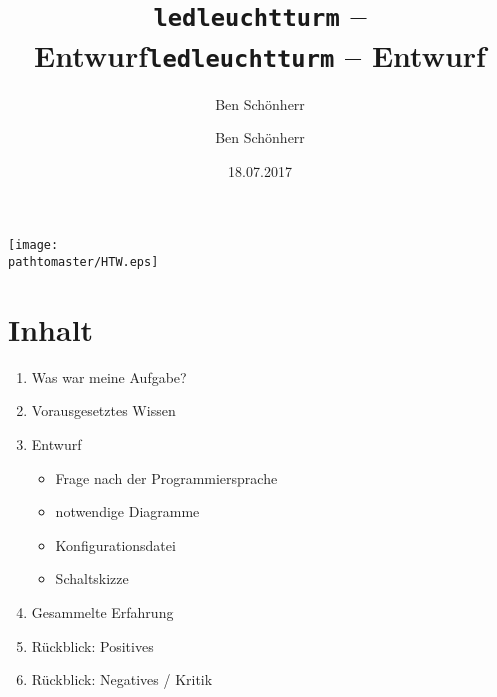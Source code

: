 \documentclass[ignorenonframetext, 11pt, table]{beamer}
\author{Ben Schönherr}
\title{\texttt{ledleuchtturm} -- Entwurf}
\date{18.07.2017}
\gdef\pathtomaster{../_LaTeX_master}
\begin{document}
\author{Ben Schönherr}
\title{\texttt{ledleuchtturm} -- Entwurf}

\begin{frame}[plain]
\begin{center}
\texttt{[image: \\pathtomaster/HTW.eps]}
\end{center}
\maketitle
\end{frame}
\section{Inhalt}
\begin{frame}
	\begin{enumerate}
		\setlength\itemsep{0.2em}
		\item Was war meine Aufgabe?
		\item Vorausgesetztes Wissen	
		\item Entwurf
		\begin{itemize}
			\setlength\itemsep{0.2em}
			\item Frage nach der Programmiersprache
			\item notwendige Diagramme
			\item Konfigurationsdatei
			\item Schaltskizze
		\end{itemize}	
		\item Gesammelte Erfahrung
		\item Rückblick: Positives
		\item Rückblick: Negatives / Kritik
	\end{enumerate}
\end{frame}
\end{document}
